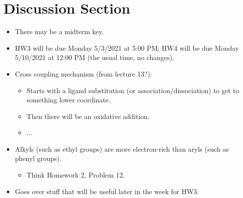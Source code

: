 \documentclass[../notes.tex]{subfiles}
\begin{document}
\section{Discussion Section}
\begin{itemize}
    \item {}There may be a midterm key.
    \item HW3 will be due Monday 5/3/2021 at 5:00 PM; HW4 will be due Monday 5/10/2021 at 12:00 PM (the usual time, no changes).
    \item Cross coupling mechanism (from lecture 13?):
    \begin{itemize}
        \item Starts with a ligand substitution (or association/dissociation) to get to something lower coordinate.
        \item Then there will be an oxidative addition.
        \item ...
    \end{itemize}
    \item Alkyls (such as ethyl groups) are more electron-rich than aryls (such as phenyl groups).
    \begin{itemize}
        \item Think Homework 2, Problem 12.
    \end{itemize}
    \item Goes over stuff that will be useful later in the week for HW3.
\end{itemize}
\end{document}
